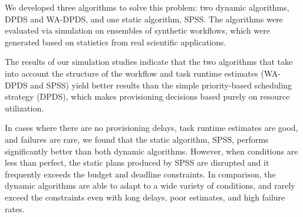 \documentclass[conference]{IEEEtran}
\begin{document}


We developed three algorithms to solve this problem: two dynamic algorithms, DPDS and WA-DPDS, and one static algorithm, SPSS. The algorithms were evaluated via simulation on ensembles of synthetic workflows, which were generated based on statistics from real scientific applications.

The results of our simulation studies indicate that the two algorithms that take into account the structure of the workflow and task runtime estimates (WA-DPDS and SPSS) yield better results than the simple priority-based scheduling strategy (DPDS), which makes provisioning decisions based purely on resource utilization.

In cases where there are no provisioning delays, task runtime estimates are good, and failures are rare, we found that the static algorithm, SPSS, performs significantly better than both dynamic algorithms. However, when conditions are less than perfect, the static plans produced by SPSS are disrupted and it frequently exceeds the budget and deadline constraints. In comparison, the dynamic algorithms are able to adapt to a wide variety of conditions, and rarely exceed the constraints even with long delays, poor estimates, and high failure rates.

\end{document}
